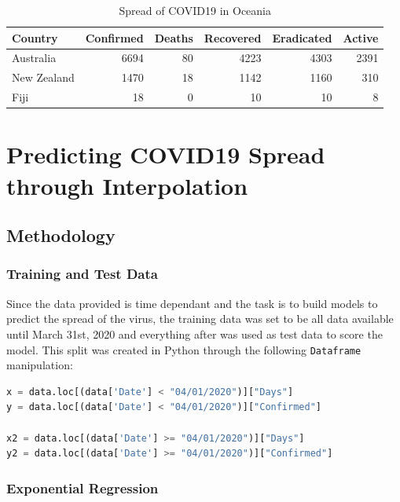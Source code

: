 \documentclass{homework}
\begin{document}
\vspace{-1em}

\begin{table}[H]
  \caption{Spread of COVID19 in Oceania}
  \label{Oceania Spread}
  \centering
  \begin{tabular}{lrrrrr}
    \toprule
    Country     & Confirmed & Deaths & Recovered & Eradicated & Active \\
    \midrule
    Australia   & 6694      & 80     & 4223      & 4303       & 2391   \\
    New Zealand & 1470      & 18     & 1142      & 1160       & 310    \\
    Fiji        & 18        & 0      & 10        & 10         & 8      \\
    \bottomrule
  \end{tabular}
\end{table}


\newpage
\section{Predicting COVID19 Spread through Interpolation}

\subsection{Methodology}

\subsubsection{Training and Test Data}

Since the data provided is time dependant and the task is to build models to predict the spread of the virus, the training data was set to be all data available until March 31st, 2020 and everything after was used as test data to score the model. This split was created in Python through the following \texttt{Dataframe} manipulation:

\begin{lstlisting}[language=Python, caption={Training and Test Data Split}]
x = data.loc[(data['Date'] < "04/01/2020")]["Days"]
y = data.loc[(data['Date'] < "04/01/2020")]["Confirmed"]

x2 = data.loc[(data['Date'] >= "04/01/2020")]["Days"]
y2 = data.loc[(data['Date'] >= "04/01/2020")]["Confirmed"]
\end{lstlisting}

\subsubsection{Exponential Regression}
\end{document}
